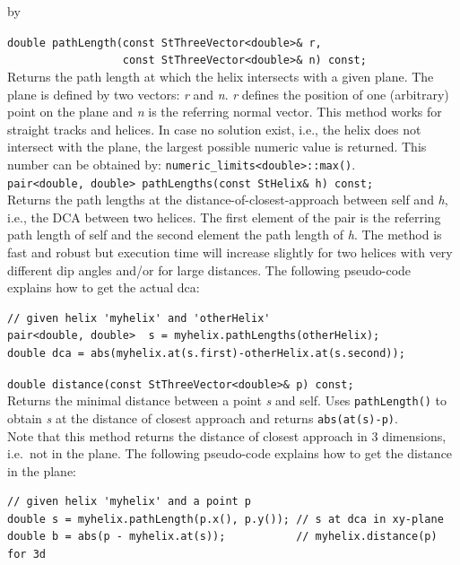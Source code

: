 \documentclass[twoside]{article}
\newcommand{\comp}[1]{\texttt{#1}}%
\newcommand{\args}[1]{\textit{#1}}%
\newcommand{\entrylabel}[1]{\mbox{\textbf{{#1}}}\hfil}%
\newenvironment{entry}
{\begin{list}{}%
    {\renewcommand{\makelabel}{\entrylabel}%
     \setlength{\labelwidth}{90pt}%
     \setlength{\leftmargin}{\labelwidth}
     \advance\leftmargin by \labelsep%
      }%
    }%
  {\end{list}}
\newcommand{\Entrylabel}[1]%
{\raisebox{0pt}[1ex][0pt]{\makebox[\labelwidth][l]%
    {\parbox[t]{\labelwidth}{\hspace{0pt}\textbf{{#1}}}}}}
\newenvironment{Entry}%
{\renewcommand{\entrylabel}{\Entrylabel}\begin{entry}}%
  {\end{entry}}
\begin{document}
\begin{Entry}
    \verb+double pathLength(const StThreeVector<double>& r,+\\
    \verb+                  const StThreeVector<double>& n) const;+\\
    Returns the path length at which the helix intersects with a
    given plane. The plane is defined by two vectors: \args{r} and
    \args{n}. \args{r} defines the position of one (arbitrary) point
    on the plane
    and \args{n} is the referring normal vector. This method works
    for straight tracks and helices. In case no solution exist, i.e.,
    the helix does not intersect with the plane, the largest possible
    numeric value is returned. This number can be obtained by:
     \verb+numeric_limits<double>::max()+.\\
     
     \verb+pair<double, double> pathLengths(const StHelix& h) const;+\\
     Returns the path lengths at the distance-of-closest-approach
       between self and
     \args{h}, i.e., the DCA between two helices.  The first element
     of the pair is the referring path length of self and the second
     element the path length of \args{h}.  The method is fast and
     robust but execution time will increase slightly for two helices
     with very different dip angles and/or for large distances.  The
     following pseudo-code explains how to get the actual dca:
    
    {\footnotesize
    \begin{verbatim}
// given helix 'myhelix' and 'otherHelix'
pair<double, double>  s = myhelix.pathLengths(otherHelix);
double dca = abs(myhelix.at(s.first)-otherHelix.at(s.second));
    \end{verbatim}
    }%

    \verb+double distance(const StThreeVector<double>& p) const;+\\
    Returns the minimal distance between a point \args{s} and self.
    Uses \comp{pathLength()} to obtain \args{s} at the distance of closest
    approach and returns \comp{abs(at(s)-p)}.\\
    Note that this method returns the distance of closest approach in 3 dimensions,
    i.e.~not in the plane. The following pseudo-code explains how to get the distance
    in the plane:
    
    {\footnotesize
    \begin{verbatim}
// given helix 'myhelix' and a point p
double s = myhelix.pathLength(p.x(), p.y()); // s at dca in xy-plane
double b = abs(p - myhelix.at(s));           // myhelix.distance(p) for 3d    
    \end{verbatim}
    }%


\end{Entry}
\end{document}
